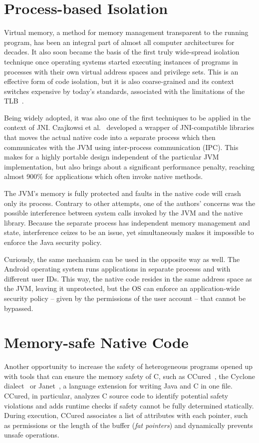 \documentclass[a4paper,12pt,twoside,openright]{report}
\begin{document}
\section{Process-based Isolation}

Virtual memory, a method for memory management transparent to the running program, has been an integral part of almost all computer architectures for decades. It also soon became the basis of the first truly wide-spread isolation technique once operating systems started executing instances of programs in processes with their own virtual address spaces and privilege sets. This is an effective form of code isolation, but it is also coarse-grained and its context switches expensive by today's standards, associated with the limitations of the TLB~\cite{basu2012reducing}. 

Being widely adopted, it was also one of the first techniques to be applied in the context of JNI. Czajkowsi et al.~\cite{989483} developed a wrapper of JNI-compatible libraries that moves the actual native code into a separate process which then communicates with the JVM using inter-process communication (IPC). This makes for a highly portable design independent of the particular JVM implementation, but also brings about a significant performance penalty, reaching almost 900\% for applications which often invoke native methods.

The JVM's memory is fully protected and faults in the native code will crash only its process. Contrary to other attempts, one of the authors' concerns was the possible interference between system calls invoked by the JVM and the native library. Because the separate process has independent memory management and state, interference ceizes to be an issue, yet simultaneously makes it impossible to enforce the Java security policy.

Curiously, the same mechanism can be used in the opposite way as well. The Android operating system runs applications in separate processs and with different user IDs. This way, the native code resides in the same address space as the JVM, leaving it unprotected, but the OS can enforce an application-wide security policy -- given by the permissions of the user account -- that cannot be bypassed.

\section{Memory-safe Native Code}

Another opportunity to increase the safety of heterogeneous programs opened up with tools that can ensure the memory safety of C, such as CCured~\cite{necula2002ccured, Condit:2003:CRW:781131.781157}, the Cyclone dialect~\cite{Jim:2002:CSD:647057.713871} or Janet~\cite{Bubak:2001:CJN:1239921.1239925}, a language extension for writing Java and C in one file. CCured, in particular, analyzes C source code to identify potential safety violations and adds runtime checks if safety cannot be fully determined statically. During execution, CCured associates a list of attributes with each pointer, such as permissions or the length of the buffer (\emph{fat pointers}) and dynamically prevents unsafe operations. 
\end{document}
